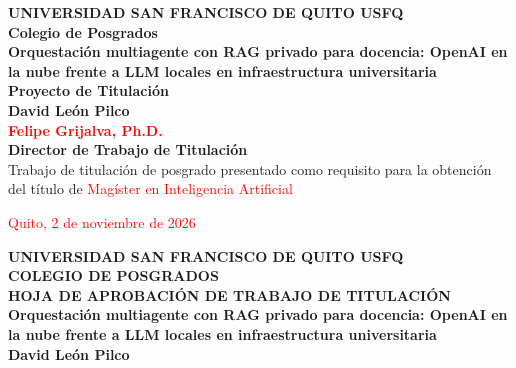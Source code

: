 \documentclass[journal]{IEEEtran}
\author{}
\date{}
\newcommand{\titulo}{Orquestación multiagente con RAG privado para docencia: OpenAI en la nube frente a LLM locales en infraestructura universitaria}
\begin{document}
\onecolumn
\thispagestyle{empty} %

\begin{center}
\textbf{\fontsize{14}{16}\selectfont UNIVERSIDAD SAN FRANCISCO DE QUITO USFQ}\\
\vspace{40pt}
\textbf{\fontsize{14}{16}\selectfont Colegio de Posgrados}\\
\vspace{90pt}
\textbf{\fontsize{14}{16}\selectfont \titulo}\\
\vspace{60pt}
\textbf{\fontsize{14}{16}\selectfont Proyecto de Titulación}\\
\vspace{90pt}
\textbf{\fontsize{18}{20}\selectfont David León Pilco}\\
\vspace{70pt}
\textbf{\fontsize{16}{18}\selectfont \textcolor{red}{Felipe Grijalva, Ph.D.}}\\
\vspace{15pt}
\textbf{\fontsize{16}{18}\selectfont Director de Trabajo de Titulación}\\
\vspace{90pt}
\fontsize{12}{14}\selectfont Trabajo de titulación de posgrado presentado como requisito para la obtención del título de \textcolor{red}{Magíster en Inteligencia Artificial}
\vspace{40pt}
\end{center}

\begin{center}
\fontsize{12}{14}\selectfont \textcolor{red}{Quito, 2 de noviembre de 2026}
\end{center}

\newpage

\begin{center}
\textbf{\fontsize{18}{16}\selectfont UNIVERSIDAD SAN FRANCISCO DE QUITO USFQ}\\
\vspace{10pt}
\textbf{\fontsize{18}{16}\selectfont COLEGIO DE POSGRADOS}\\
\vspace{20pt}
\textbf{\fontsize{14}{16}\selectfont HOJA DE APROBACIÓN DE TRABAJO DE TITULACIÓN}\\
\vspace{10pt}
\textbf{\fontsize{14}{16}\selectfont \titulo}\\
\vspace{10pt}
\textbf{\fontsize{14}{16}\selectfont David León Pilco}
\end{center}
\vspace{20pt}
\end{document}
